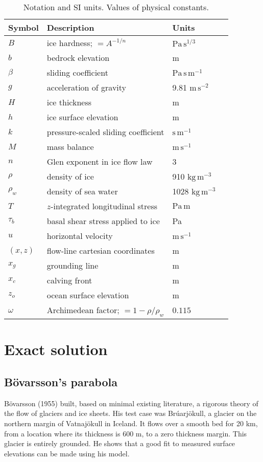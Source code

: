 \documentclass[review,letterpaper]{igs}
\renewcommand{\dh}{\fontencoding{T1}\selectfont{\symbol{240}}}
\newcommand{\bod}{B\"o\dh varsson\xspace}
\newcommand{\citebod}{B\"o\dh varsson (1955)\nocite{Bodvardsson}\xspace}
\begin{document}
\begin{table}
\caption{Notation and SI units.  Values of physical constants.}\label{tab:notation}

\medskip
\begin{tabular}{llll}
Symbol & Description & Units \\ \hline
$B$ & ice hardness; $=A^{-1/n}$ & $\text{Pa}\,\text{s}^{1/3}$  \\
$b$ & bedrock elevation & m \\
$\beta$ & sliding coefficient & $\text{Pa}\,\text{s}\,\text{m}^{-1}$ \\
$g$ & acceleration of gravity  & 9.81 $\text{m}\,\text{s}^{-2}$\\
$H$ & ice thickness & m \\
$h$ & ice surface elevation & m \\
$k$ & pressure-scaled sliding coefficient  & $\text{s}\,\text{m}^{-1}$ \\
$M$ & mass balance & $\text{m}\,\text{s}^{-1}$ \\
$n$ & Glen exponent in ice flow law & 3 \\
$\rho$ & density of ice & 910 $\text{kg}\,\text{m}^{-3}$ \\
$\rho_w$ & density of sea water & 1028 $\text{kg}\,\text{m}^{-3}$ \\
$T$ & $z$-integrated longitudinal stress & $\text{Pa}\,\text{m}$ \\
$\tau_{b}$ & basal shear stress applied to ice & Pa \\
$u$ & horizontal velocity & $\text{m}\,\text{s}^{-1}$ \\
$(x,z)$ & flow-line cartesian coordinates & m  \\
$x_g$ & grounding line & m  \\
$x_c$ & calving front & m  \\
$z_o$ & ocean surface elevation & m \\
$\omega$ & Archimedean factor; $=1 - \rho/\rho_w$ & $0.115$
\end{tabular}
\end{table}


\section{Exact solution}

\subsection*{\bod's parabola}  \citebod built, based on minimal existing literature, a rigorous theory of the flow of glaciers and ice sheets.  His test case was Br\'uarj\"okull, a glacier on the northern margin of Vatnaj\"okull in Iceland.  It flows over a smooth bed for 20 km, from a location where its thickness is 600 m, to a zero thickness margin.  This glacier is entirely grounded.  He shows that a good fit to measured surface elevations can be made using his model.
\end{document}
